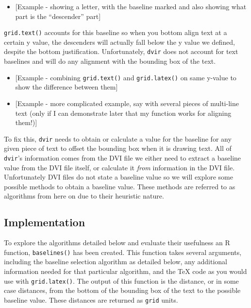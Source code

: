 \documentclass[]{article}
\providecommand{\tightlist}{%
  \setlength{\itemsep}{0pt}\setlength{\parskip}{0pt}}
\begin{document}
\begin{itemize}
\tightlist
\item
  {[}Example - showing a letter, with the baseline marked and also
  showing what part is the ``descender'' part{]}
\end{itemize}

\texttt{grid.text()} accounts for this baseline so when you bottom align
text at a certain y value, the descenders will actually fall below the y
value we defined, despite the bottom justification. Unfortunately,
\texttt{dvir} does not account for text baselines and will do any
alignment with the bounding box of the text.

\begin{itemize}
\item
  {[}Example - combining \texttt{grid.text()} and \texttt{grid.latex()}
  on same y-value to show the difference between them{]}
\item
  {[}Example - more complicated example, say with several pieces of
  multi-line text (only if I can demonstrate later that my function
  works for aligning them!){]}
\end{itemize}

To fix this, \texttt{dvir} needs to obtain or calculate a value for the
baseline for any given piece of text to offset the bounding box when it
is drawing text. All of \texttt{dvir}'s information comes from the DVI
file we either need to extract a baseline value from the DVI file
itself, or calculate it \emph{from} information in the DVI file.
Unfortunately DVI files do not state a baseline value so we will explore
some possible methods to obtain a baseline value. These methods are
referred to as algorithms from here on due to their heuristic nature.

\subsection{Implementation}\label{implementation}

To explore the algorithms detailed below and evaluate their usefulness
an R function, \texttt{baselines()} has been created. This function
takes several arguments, including the baseline selection algorithm as
detailed below, any additional information needed for that particular
algorithm, and the \TeX{} code as you would use with
\texttt{grid.latex()}. The output of this function is the distance, or
in some case distances, from the bottom of the bounding box of the text
to the possible baseline value. These distances are returned as
\texttt{grid} units.
\end{document}
